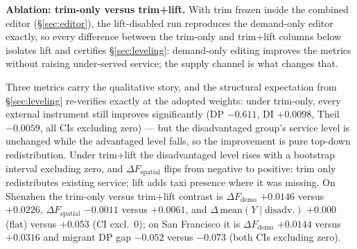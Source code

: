 \textbf{Ablation: trim-only versus trim+lift.}\label{sec:exp-ablation}
With trim frozen inside the combined editor (\S\ref{sec:editor}), the
lift-disabled run reproduces the demand-only editor exactly, so every
difference between the trim-only and trim+lift columns below isolates lift
and certifies \S\ref{sec:leveling}: demand-only editing improves the
metrics without raising under-served service; the supply channel is what
changes that.

Three metrics carry the qualitative story, and the structural expectation from
\S\ref{sec:leveling} re-verifies exactly at the adopted weights: under
trim-only, every external instrument still improves significantly (DP
$-0.611$, DI $+0.0098$, Theil $-0.0059$, all CIs excluding zero) --- but the
disadvantaged group's service level is unchanged while the advantaged level
falls, so the improvement is pure top-down redistribution. Under trim+lift
the disadvantaged level rises with a bootstrap interval excluding zero, and
$\Delta F_{\mathrm{spatial}}$ flips from negative to positive: trim only
redistributes existing service; lift adds taxi presence where it was
missing. On Shenzhen
the trim-only versus trim+lift contrast is
$\Delta F_{\mathrm{demo}}$ $+0.0146$ versus $+0.0226$, %
$\Delta F_{\mathrm{spatial}}$ $-0.0011$ versus $+0.0061$, and %
$\Delta\,\mathrm{mean}(Y \mid \mathrm{disadv.})$ $+0.000$ (flat) versus $+0.053$ (CI excl.\ 0); %
on San Francisco it is $\Delta F_{\mathrm{demo}}$ $+0.0144$ versus $+0.0316$ %
and migrant DP gap $-0.052$ versus $-0.073$ (both CIs excluding zero). %

